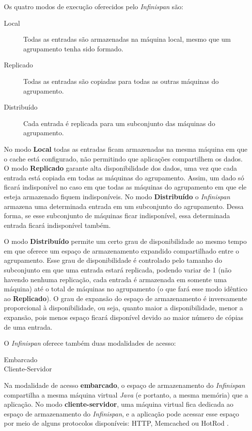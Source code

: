 \documentclass[11pt,twoside,a4paper]{book}
\begin{document}
Os quatro modos de execução oferecidos pelo \emph{Infinispan} são:

\begin{description}
	\item[Local] Todas as entradas são armazenadas na máquina local, mesmo que um agrupamento tenha sido formado.
	\item[Replicado] Todas as entradas são copiadas para todas as outras máquinas do agrupamento.
	\item[Distribuído] Cada entrada é replicada para um subconjunto das máquinas do agrupamento.
\end{description}

No modo \textbf{Local} todas as entradas ficam armazenadas na mesma máquina em que o cache está configurado, não permitindo 
que aplicações compartilhem os dados. O modo \textbf{Replicado} garante alta disponibilidade dos dados, uma vez que cada 
entrada está copiada em todas as máquinas do agrupamento. Assim, um dado só ficará indisponível no caso em que todas as 
máquinas do agrupamento em que ele esteja armazenado fiquem indisponíveis. No modo \textbf{Distribuído} o \emph{Infinispan} 
armazena uma determinada entrada em um subconjunto do agrupamento. Dessa forma, se esse subconjunto de máquinas ficar indisponível, 
essa determinada entrada ficará indisponível também. 

O modo \textbf{Distribuído} permite um certo grau de disponibilidade ao mesmo tempo em que oferece um espaço de armazenamento
expandido compartilhado entre o agrupamento. Esse grau de disponibilidade é controlado pelo tamanho do subconjunto em que uma
entrada estará replicada, podendo variar de 1 (não havendo nenhuma replicação, cada entrada é armazenada em somente uma máquina) até
o total de máquinas no agrupamento (o que fará esse modo idêntico ao \textbf{Replicado}). O grau de expansão do espaço de armazenamento
é inversamente proporcional à disponibilidade, ou seja, quanto maior a disponibilidade, menor a expansão, pois menos espaço ficará
disponível devido ao maior número de cópias de uma entrada.

O \emph{Infinispan} oferece também duas modalidades de acesso:

\begin{description}
	\item[Embarcado]
	\item[Cliente-Servidor] 
\end{description}

Na modalidade de acesso \textbf{embarcado}, o espaço de armazenamento do \emph{Infinispan} compartilha a mesma máquina virtual \emph{Java}
(e portanto, a mesma memória) que a aplicação. No modo \textbf{cliente-servidor}, uma máquina virtual fica dedicada ao espaço de armazenamento do \emph{Infinispan}, e a aplicação pode acessar esse espaço por meio de alguns protocolos disponíveis: HTTP, Memcached ou HotRod \cite{infinispan}.
\end{document}
